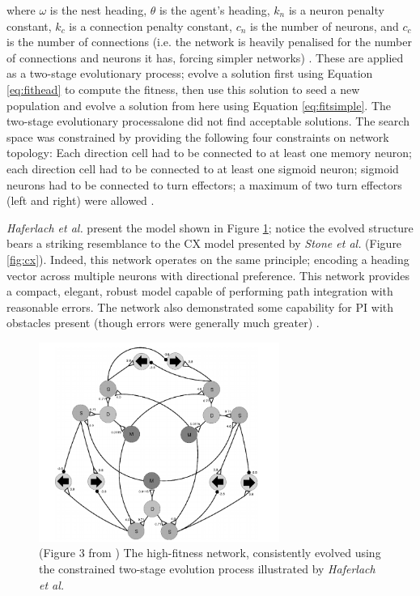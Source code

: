 \documentclass[a4paper,11pt,twoside,openright]{article}
\begin{document}
where $\omega$ is the nest heading, $\theta$ is the agent's heading, $k_n$ is
a neuron penalty constant, $k_c$ is a connection penalty constant, $c_n$ is
the number of neurons, and $c_c$ is the number of connections (i.e.
the network is heavily penalised for the number of connections and neurons it
has, forcing simpler networks) \cite{Haferlach2007}. These are applied as a
two-stage evolutionary process; evolve a solution first using Equation
\ref{eq:fithead} to compute the fitness, then use this solution to seed a new
population and evolve a solution from here using Equation \ref{eq:fitsimple}. The
two-stage evolutionary processalone did not find acceptable solutions. The search
space was constrained by providing the following four constraints on network
topology: Each direction cell had to be connected to at least one memory neuron;
each direction cell had to be connected to at least one sigmoid neuron; sigmoid
neurons had to be connected to turn effectors; a maximum of two turn effectors
(left and right) were allowed \cite{Haferlach2007}.
\newline
\par

\textit{Haferlach et al.} present the model shown in Figure
\ref{fig:evolvednetwork}; notice the evolved structure bears a striking
resemblance to the CX model presented by \textit{Stone et al.} (Figure
\ref{fig:cx}). Indeed, this network operates on the same principle; encoding
a heading vector across multiple neurons with directional preference. This
network provides a compact, elegant, robust model capable of performing
path integration with reasonable errors. The network also demonstrated
some capability for PI with obstacles present (though errors were generally much
greater) \cite{Haferlach2007}.

\begin{figure}[h!]
  \centering
  \includegraphics[width=0.7\textwidth]{EvolvedNetwork}
  \caption{\label{fig:evolvednetwork} (Figure 3 from \cite{Haferlach2007})
    The high-fitness network, consistently evolved using the constrained
    two-stage evolution process illustrated by \textit{Haferlach et al.}
  }
\end{figure}
\end{document}
